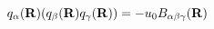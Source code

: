 \begin{equation}                      
q_{\alpha}({\bf R}) (q_{\beta}({\bf R}) q_{\gamma}({\bf R})) = - u_{0}                       
B_{\alpha \beta \gamma}({\bf R})                      
\end{equation} 
